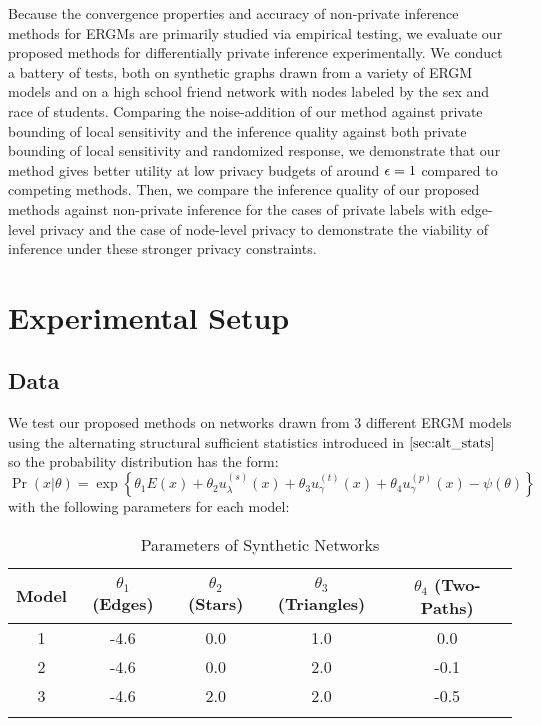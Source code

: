  Because the convergence properties and accuracy of non-private inference methods for ERGMs are primarily studied via empirical testing, we evaluate our proposed methods for differentially private inference experimentally. We conduct a battery of tests, both on synthetic graphs drawn from a variety of ERGM models and on a high school friend network with nodes labeled by the sex and race of students. Comparing the noise-addition of our method against private bounding of local sensitivity and the inference quality against both private bounding of local sensitivity and randomized response, we demonstrate that our method gives better utility at low privacy budgets of around $\epsilon =1$ compared to competing methods. Then, we compare the inference quality of our proposed methods against non-private inference for the cases of private labels with edge-level privacy and the case of node-level privacy to demonstrate the viability of inference under these stronger privacy constraints.
 
 \section{Experimental Setup}
 
 \subsection*{Data}
 	We test our proposed methods on networks drawn from $3$ different ERGM models using the alternating structural sufficient statistics introduced in $\Cref{sec:alt_stats}$ so the probability distribution has the form:
 	$$\Pr(x | \theta) = \exp\left\{\theta_1 E(x) + \theta_2 u_\lambda^{(s)}(x) + \theta_3 u_\gamma^{(t)}(x)  + \theta_4 u_\gamma^{(p)}(x) - \psi(\theta)  \right\} $$
 	 with the following parameters for each model:
 	\begin{table}[!ht]
 		\label{table:ergm_params}
 		\centering
 		\begin{tabular}{|c|c|c|c|c|}
 			\hhline{|=====|}
 			Model & $\theta_1$ (Edges) & $\theta_2$ (Stars) & $\theta_3$ (Triangles) & $\theta_4$ (Two-Paths) \\ \hline
			1 & -4.6 & 0.0 & 1.0 & 0.0  \\
			2 & -4.6 & 0.0 & 2.0 & -0.1 \\
			3 & -4.6 & 2.0 & 2.0 & -0.5 \\
			\hhline{|=====|}
 		\end{tabular}
 	\caption{Parameters of Synthetic Networks}
 	\end{table}
 
